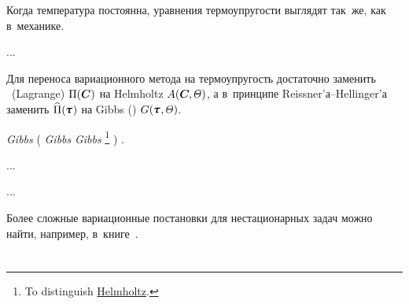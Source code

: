 \begin{otherlanguage}{russian}

Когда
температура
постоянна,
уравнения термоупругости
выглядят
так~же, как
в~механике.

...

Для переноса вариационного метода на термоупругость достаточно заменить ~(Lagrange)  ${\Pi(\bm{C})}$ на Helmholtz ${A(\bm{C}\hspace{-0.12ex}, \temperaturefield)}$, а в~принципе Reissner’а--Hellinger’а заменить ${\widehat{\potential}(\hspace{-0.1ex}\cauchystress\hspace{.12ex})}$ на Gibbs () ${G(\hspace{-0.1ex}\cauchystress\hspace{.12ex}, \temperaturefield)}$.

{} \emph{Gibbs}
(%
  \emph{Gibbs}
  \emph{Gibbs}
  \emph{}%
  \footnote{%
    To distinguish
    \href{https://en.wikipedia.org/wiki/Helmholtz_free_energy}{Helmholtz}.%
  }%
)
\ru{,}
\href{https://en.wikipedia.org/wiki/Reversible_process_(thermodynamics)}{}\ru{,}
.

...

...

Более сложные вариационные постановки для нестационарных задач можно найти, например, в~книге~\cite{belyaev.ryadno}.

\end{otherlanguage}

\section*{\small \wordforbibliography}

